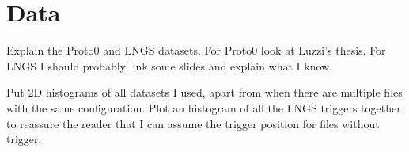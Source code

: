 \chapter{Data}

Explain the Proto0 and LNGS datasets. For Proto0 look at Luzzi's thesis. For
LNGS I should probably link some slides and explain what I know.

Put 2D histograms of all datasets I used, apart from when there are multiple
files with the same configuration. Plot an histogram of all the LNGS triggers
together to reassure the reader that I can assume the trigger position for
files without trigger.

